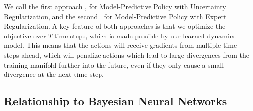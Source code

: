\documentclass{article} %
\begin{document}

        We call the first approach \modelnamedrop, for Model-Predictive Policy with Uncertainty Regularization, and the second \modelnameil, for Model-Predictive Policy with Expert Regularization.
        A key feature of both approaches is that we optimize the objective over $T$ time steps, which is made possible by our learned dynamics model.
        This means that the actions will receive gradients from multiple time steps ahead, which will penalize actions which lead to large divergences from the training manifold further into the future, even if they only cause a small divergence at the next time step.

\subsection{Relationship to Bayesian Neural Networks}
\end{document}
